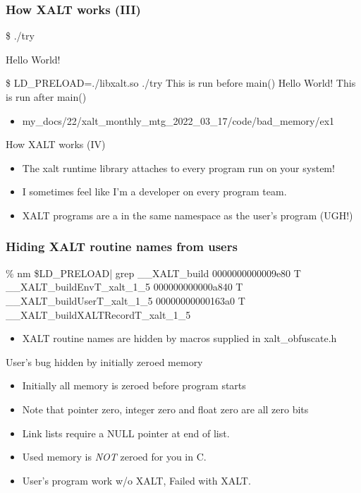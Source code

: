 \documentclass{beamer}
\begin{document}
\begin{frame}[fragile]
    \frametitle{How XALT works (III)}
 {\small
    \begin{semiverbatim}
\$ ./try

Hello World!

\$ LD\_PRELOAD=./libxalt.so  ./try
This is run before main()
Hello World!
This is run after main()
    \end{semiverbatim}
}
  \begin{itemize}
    \item my\_docs/22/xalt\_monthly\_mtg\_2022\_03\_17/code/bad\_memory/ex1
  \end{itemize}

\end{frame}

\begin{frame}{How XALT works (IV)}
  \begin{itemize}
    \item The xalt runtime library attaches to every program run on
      your system!
    \item I sometimes feel like I'm a developer on every program team.
    \item XALT programs are a in the same namespace as the user's
      program (UGH!)
  \end{itemize}
\end{frame}



\begin{frame}[fragile]
    \frametitle{Hiding XALT routine names from users}
 {\tiny
    \begin{semiverbatim}
\% nm \$LD\_PRELOAD| grep \_\_XALT\_build
0000000000009e80 T \_\_XALT\_buildEnvT\_xalt\_1\_5
000000000000a840 T \_\_XALT\_buildUserT\_xalt\_1\_5
00000000000163a0 T \_\_XALT\_buildXALTRecordT\_xalt\_1\_5
    \end{semiverbatim}
}
  \begin{itemize}
    \item XALT routine names are hidden by macros supplied in xalt\_obfuscate.h
  \end{itemize}

\end{frame}


\begin{frame}{User's bug hidden by initially zeroed memory}
  \begin{itemize}
    \item Initially all memory is zeroed before program starts
    \item Note that pointer zero, integer zero and float zero are all
      zero bits
    \item Link lists require a NULL pointer at end of list.
    \item Used memory is {\color{red} \emph{NOT}} zeroed for you in C.
    \item User's program work w/o XALT, Failed with XALT.
  \end{itemize}
\end{frame}
\end{document}
